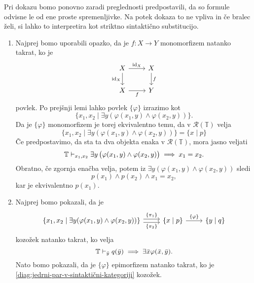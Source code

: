 \documentclass[../kategoricna_logika.tex]{subfiles}
\begin{document}
  \begin{dokaz}
    Pri dokazu bomo ponovno zaradi preglednosti predpostavili, da so
    formule odvisne le od ene proste spremenljivke. Na potek dokaza to
    ne vpliva in če bralec želi, si lahko to interpretira kot striktno
    sintaktično substitucijo.
    \begin{enumerate}[label=(\roman*)]
    \item Najprej bomo uporabili opazko, da je $f : X \to Y$
      monomorfizem natanko takrat, ko je
      \begin{equation*}
        \begin{tikzcd}
          X \ar[d, " \mathrm{id}_X"'] \ar[r, " \mathrm{id}_X"] & X \ar[d, "f"] \\
          X \ar[r, "f"'] & Y
        \end{tikzcd}
      \end{equation*}
      povlek. Po prejšnji lemi lahko povlek $\{\varphi\}$ izrazimo kot
      \[ \{ x_1,x_2 \mid \exists y(\varphi(x_1,y) \land
        \varphi(x_2,y)) \}.\] Da je $\{\varphi\}$ monomorfizem je
      torej ekvivalentno temu, da v $\mathcal{R}(\mathbb{T})$ velja
      \[ \{ x_1,x_2 \mid \exists y(\varphi(x_1,y) \land
        \varphi(x_2,y)) \} = \{x \mid p\} \] Če predpostavimo, da sta
      ta dva objekta enaka v $\mathcal{R}(\mathbb{T})$, mora jasno
      veljati
    $$\mathbb{T} \vdash_{x_1,x_2}  \exists y \left( \varphi(x_1,y) \wedge \varphi(x_2,y) \right) \implies x_1 = x_2 .$$
    Obratno, če zgornja enačba velja, potem iz
    $\exists y(\varphi(x_1,y) \land \varphi(x_2,y))$ sledi
    \[p(x_1) \land p(x_2) \land x_1 = x_2,\] kar je ekvivalentno
    $p(x_1)$.

  \item
    Najprej bomo pokazali, da je
    \begin{equation}\label{diag:jederni-par-v-sintakticni-kategoriji}
      \begin{tikzcd}[column sep=normal]
        \{ x_1,x_2 \mid \exists y(\varphi(x_1,y) \land \varphi(x_2,y))
        \} \ar[r, shift left, "\{\pi_1\}"] \ar[r, shift right,
        "\{\pi_2\}"'] & \{x \mid p\} \ar[r, "\{\varphi\}"] & \{y \mid
        q\}
      \end{tikzcd}
    \end{equation}
    kozožek natanko takrat, ko velja
    $$\mathbb{T} \vdash_{\bar{y}} q(\bar{y}) \implies \exists \bar{x} \varphi(\bar{x},\bar{y}).$$
    Nato bomo pokazali, da je $\{ \varphi\}$ epimorfizem natanko takrat, ko
    je \eqref{diag:jedrni-par-v-sintaktični-kategoriji} kozožek.



\end{enumerate}
\end{dokaz}
\end{document}
